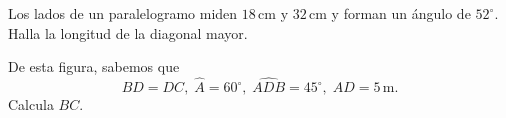 \documentclass[12pt]{exam}
\begin{document}
\begin{questions}

\question Los lados de un paralelogramo miden \( 18 \, \text{cm} \) y \( 32 \, \text{cm} \) y forman un ángulo de \( 52^\circ \). Halla la longitud de la diagonal mayor.

\question De esta figura, sabemos que  
\[
BD = DC, \; \hat{A} = 60^\circ, \; \hat{ADB} = 45^\circ, \; AD = 5 \, \text{m}.
\]  
Calcula \( BC \).

\end{questions}
\end{document}
